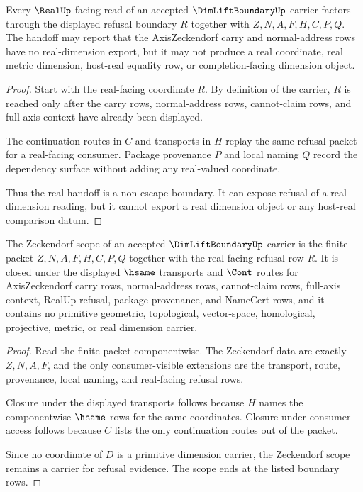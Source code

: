 \begin{theorem}
\label{thm:dimliftboundary-real-handoff-nonescape}
Every $\RealUp$-facing read of an accepted $\DimLiftBoundaryUp$ carrier factors through the displayed refusal boundary $R$ together with $Z,N,A,F,H,C,P,Q$. The handoff may report that the AxisZeckendorf carry and normal-address rows have no real-dimension export, but it may not produce a real coordinate, real metric dimension, host-real equality row, or completion-facing dimension object.
\end{theorem}
\begin{proof}
Start with the real-facing coordinate $R$. By definition of the carrier, $R$ is reached only after the carry rows, normal-address rows, cannot-claim rows, and full-axis context have already been displayed.

The continuation routes in $C$ and transports in $H$ replay the same refusal packet for a real-facing consumer. Package provenance $P$ and local naming $Q$ record the dependency surface without adding any real-valued coordinate.

Thus the real handoff is a non-escape boundary. It can expose refusal of a real dimension reading, but it cannot export a real dimension object or any host-real comparison datum.
\end{proof}

\begin{theorem}
\label{thm:dimliftboundary-zeckendorf-carrier-scope}
The Zeckendorf scope of an accepted $\DimLiftBoundaryUp$ carrier is the finite packet $Z,N,A,F,H,C,P,Q$ together with the real-facing refusal row $R$. It is closed under the displayed $\hsame$ transports and $\Cont$ routes for AxisZeckendorf carry rows, normal-address rows, cannot-claim rows, full-axis context, RealUp refusal, package provenance, and NameCert rows, and it contains no primitive geometric, topological, vector-space, homological, projective, metric, or real dimension carrier.
\end{theorem}
\begin{proof}
Read the finite packet componentwise. The Zeckendorf data are exactly $Z,N,A,F$, and the only consumer-visible extensions are the transport, route, provenance, local naming, and real-facing refusal rows.

Closure under the displayed transports follows because $H$ names the componentwise $\hsame$ rows for the same coordinates. Closure under consumer access follows because $C$ lists the only continuation routes out of the packet.

Since no coordinate of $D$ is a primitive dimension carrier, the Zeckendorf scope remains a carrier for refusal evidence. The scope ends at the listed boundary rows.
\end{proof}


